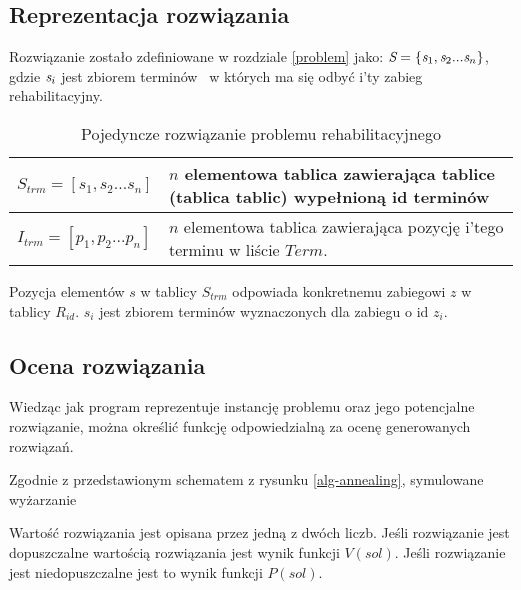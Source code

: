 \subsection{Reprezentacja rozwiązania}
Rozwiązanie zostało zdefiniowane w rozdziale \ref{problem} jako:
$\emph{S}=\{\emph{s}_1,\emph{s}_2...\emph{s}_n\}$, gdzie $\emph{s}_i$ jest
zbiorem terminów \sTerm\ w których ma się odbyć i'ty zabieg rehabilitacyjny.
\begin{table}[h]
	\begin{tabular}{ | m{} | m{} | }
		\hline
		$S_{trm}=[s_1,s_2...s_n]$ & $n$ elementowa tablica zawierająca tablice
		(tablica tablic) wypełnioną id terminów \\
		\hline
		$I_{trm}=[p_1,p_2...p_n]$ & $n$ elementowa tablica zawierająca pozycję i'tego terminu w liście $Term$.\\
		\hline
\end{tabular}
\caption{Pojedyncze rozwiązanie problemu rehabilitacyjnego}
\end{table}
Pozycja elementów $s$ w tablicy $S_{trm}$ odpowiada konkretnemu zabiegowi $z$ w tablicy
$R_{id}$. $s_i$ jest zbiorem terminów wyznaczonych dla zabiegu o id $z_i$.
\subsection{Ocena rozwiązania}
Wiedząc jak program reprezentuje instancję problemu oraz jego potencjalne
rozwiązanie, można określić funkcję odpowiedzialną za ocenę generowanych
rozwiązań.

Zgodnie z przedstawionym schematem z rysunku \ref{alg-annealing}, symulowane
wyżarzanie

Wartość rozwiązania jest opisana przez jedną z dwóch liczb. Jeśli rozwiązanie
jest dopuszczalne wartością rozwiązania jest wynik funkcji $V(sol)$. Jeśli
rozwiązanie jest niedopuszczalne jest to wynik funkcji $P(sol)$.

